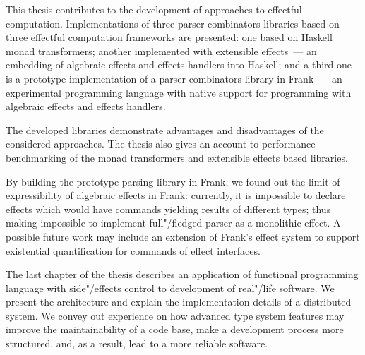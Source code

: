 \Conc

This thesis contributes to the development of approaches to effectful computation.
Implementations of three parser combinators libraries based on three
effectful computation frameworks are presented: one based on Haskell monad transformers;
another implemented with extensible effects~--- an embedding of algebraic effects
and effects handlers into Haskell; and a third one is a prototype implementation
of a parser combinators library in Frank~--- an experimental programming language
with native support for programming with algebraic effects and effects handlers.

The developed libraries demonstrate advantages and disadvantages of the considered
approaches. The thesis also gives an account to performance benchmarking of the monad
transformers and extensible effects based libraries.

By building the prototype parsing library in Frank, we found out the limit of
expressibility of algebraic effects in Frank: currently, it is impossible to
declare effects which would have commands yielding results of different types;
thus making impossible to implement full"/fledged parser as a monolithic effect.
A possible future work may include an extension of Frank's effect system to support
existential quantification for commands of effect interfaces.

The last chapter of the thesis describes an application of functional programming
language with side"/effects control to development of real"/life software. We
present the architecture and explain the implementation details of a distributed
system. We convey out experience on how advanced type system features may improve
the maintainability of a code base, make a development process more structured,
and, as a result, lead to a more reliable software.


